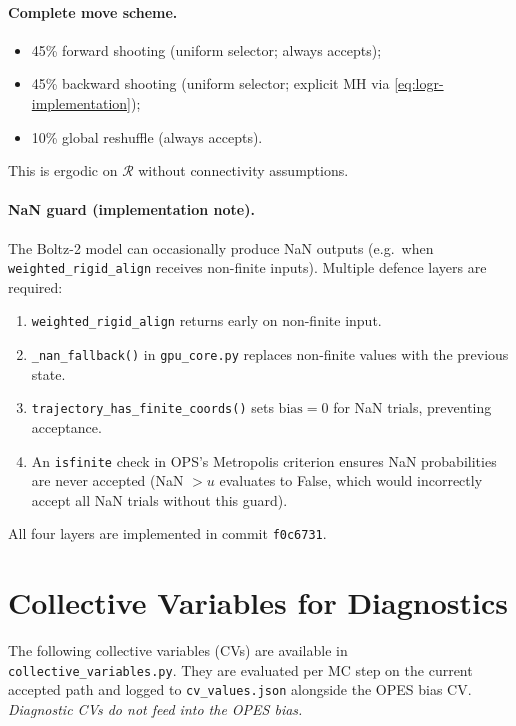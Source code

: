 \documentclass[11pt,a4paper]{article}
\begin{document}
\paragraph{Complete move scheme.}
\begin{itemize}
  \item 45\% forward shooting (uniform selector; always accepts);
  \item 45\% backward shooting (uniform selector; explicit MH via
    \cref{eq:logr-implementation});
  \item 10\% global reshuffle (always accepts).
\end{itemize}
This is ergodic on $\mathcal{R}$ without connectivity assumptions.

\paragraph{NaN guard (implementation note).}
The Boltz-2 model can occasionally produce NaN outputs (e.g.\ when
\texttt{weighted\_rigid\_align} receives non-finite inputs).  Multiple
defence layers are required:
\begin{enumerate}
  \item \texttt{weighted\_rigid\_align} returns early on non-finite input.
  \item \texttt{\_nan\_fallback()} in \texttt{gpu\_core.py} replaces
    non-finite values with the previous state.
  \item \texttt{trajectory\_has\_finite\_coords()} sets $\mathrm{bias}=0$
    for NaN trials, preventing acceptance.
  \item An \texttt{isfinite} check in OPS's Metropolis criterion ensures
    NaN probabilities are never accepted (NaN $> u$ evaluates to False,
    which would incorrectly accept all NaN trials without this guard).
\end{enumerate}
All four layers are implemented in commit \texttt{f0c6731}.

\section{Collective Variables for Diagnostics}
\label{sec:cvs}

The following collective variables (CVs) are available in
\texttt{collective\_variables.py}.  They are evaluated per MC step on the
current accepted path and logged to \texttt{cv\_values.json} alongside the
OPES bias CV.  \emph{Diagnostic CVs do not feed into the OPES bias.}
\end{document}
